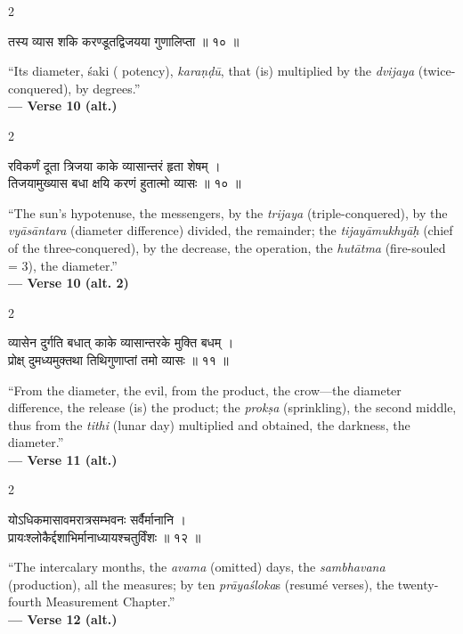 \documentclass[11pt,a4paper]{article}
\newcommand{\dev}[1]{{\devanagarifont #1}}
\newenvironment{bilingualverse}{%
  \begin{paracol}{2}
  \fontsize{10.5}{13}\selectfont
}{%
  \end{paracol}
  \vspace{0.3cm}
}
\begin{document}
\begin{bilingualverse}
\begin{leftcolumn*}
\dev{तस्य व्यास शकि करण्डूतद्विजयया गुणालिप्ता ॥ १० ॥}
\end{leftcolumn*}
\begin{rightcolumn}
``Its diameter, śaki ( potency), \textit{karaṇḍū}, that (is) multiplied by the \textit{dvijaya} (twice-conquered), by degrees.''\\[0.3cm]
\hfill\textbf{— Verse 10 (alt.)}
\end{rightcolumn}
\end{bilingualverse}

\begin{bilingualverse}
\begin{leftcolumn*}
\dev{रविकर्णं दूता त्रिजया काके व्यासान्तरं हृता शेषम् ।}\\
\dev{तिजयामुख्यास बधा क्षयि करणं हुतात्मो व्यासः ॥ १० ॥}
\end{leftcolumn*}
\begin{rightcolumn}
``The sun's hypotenuse, the messengers, by the \textit{trijaya} (triple-conquered), by the \textit{vyāsāntara} (diameter difference) divided, the remainder; the \textit{tijayāmukhyāḥ} (chief of the three-conquered), by the decrease, the operation, the \textit{hutātma} (fire-souled = 3), the diameter.''\\[0.3cm]
\hfill\textbf{— Verse 10 (alt. 2)}
\end{rightcolumn}
\end{bilingualverse}

\begin{bilingualverse}
\begin{leftcolumn*}
\dev{व्यासेन दुर्गति बधात् काके व्यासान्तरके मुक्ति बधम् ।}\\
\dev{प्रोक्ष् दुमध्यमुक्तथा तिथिगुणाप्तां तमो व्यासः ॥ ११ ॥}
\end{leftcolumn*}
\begin{rightcolumn}
``From the diameter, the evil, from the product, the crow---the diameter difference, the release (is) the product; the \textit{prokṣa} (sprinkling), the second middle, thus from the \textit{tithi} (lunar day) multiplied and obtained, the darkness, the diameter.''\\[0.3cm]
\hfill\textbf{— Verse 11 (alt.)}
\end{rightcolumn}
\end{bilingualverse}

\begin{bilingualverse}
\begin{leftcolumn*}
\dev{योऽधिकमासावमरात्रसम्भवनः सर्वैर्मानानि ।}\\
\dev{प्रायःश्लोकैर्द्दशाभिर्मानाध्यायश्चतुर्विंशः ॥ १२ ॥}
\end{leftcolumn*}
\begin{rightcolumn}
``The intercalary months, the \textit{avama} (omitted) days, the \textit{sambhavana} (production), all the measures; by ten \textit{prāyaśloka}s (resumé verses), the twenty-fourth Measurement Chapter.''\\[0.3cm]
\hfill\textbf{— Verse 12 (alt.)}
\end{rightcolumn}
\end{bilingualverse}
\end{document}
